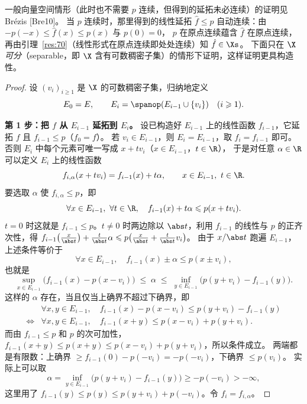 一般向量空间情形（此时也不需要 $p$ 连续，但得到的延拓未必连续）的证明见 Brézis [Bre10]。
当 $p$ 连续时，那里得到的线性延拓 $\hat f\leqslant p$ 自动连续：由 $-p(-x)\leqslant\hat f(x)\leqslant p(x)$ 与 $p(0)=0$，
$p$ 在原点连续蕴含 $\hat f$ 在原点连续，再由引理~\ref{res:70}（线性形式在原点连续即处处连续）知 $\hat f\in\Xs$。
下面只在 $\X$ \emph{可分}（separable，即 $\X$ 含有可数稠密子集）的情形下证明，这样证明更具构造性。

\begin{proof}
设 $(v_i)_{i\geqslant1}$ 是 $\X$ 的可数稠密子集，归纳地定义
\[
  E_0=E,\qquad E_i=\spanop(E_{i-1}\cup\{v_i\})\quad(i\geqslant1).
\]

\textbf{第 1 步：把 $f$ 从 $E_{i-1}$ 延拓到 $E_i$。}
设已构造好 $E_{i-1}$ 上的线性函数 $f_{i-1}$，它延拓 $f$ 且 $f_{i-1}\leqslant p$（$f_0=f$）。
若 $v_i\in E_{i-1}$，则 $E_i=E_{i-1}$，取 $f_i=f_{i-1}$ 即可。否则 $E_i$ 中每个元素可唯一写成 $x+tv_i$（$x\in E_{i-1}$，$t\in\R$），
于是对任意 $\alpha\in\R$ 可以定义 $E_i$ 上的线性函数
\[
  f_{i,\alpha}(x+tv_i)=f_{i-1}(x)+t\alpha,\qquad x\in E_{i-1},\ t\in\R .
\]
要选取 $\alpha$ 使 $f_{i,\alpha}\leqslant p$，即
\[
  \forall x\in E_{i-1},\ \forall t\in\R,\quad f_{i-1}(x)+t\alpha\leqslant p(x+tv_i).
\]
$t=0$ 时这就是 $f_{i-1}\leqslant p$。$t\neq0$ 时两边除以 $\abs t$，利用 $f_{i-1}$ 的线性与 $p$ 的正齐次性，得
$f_{i-1}\bigl(\tfrac{x}{\abs t}\bigr)+\tfrac{t}{\abs t}\alpha\leqslant p\bigl(\tfrac{x}{\abs t}+\tfrac{t}{\abs t}v_i\bigr)$。
由于 $x/\abs t$ 跑遍 $E_{i-1}$，上述条件等价于
\[
  \forall x\in E_{i-1},\quad f_{i-1}(x)\pm\alpha\leqslant p(x\pm v_i),
\]
也就是
\[
  \sup_{x\in E_{i-1}}\bigl(f_{i-1}(x)-p(x-v_i)\bigr)\;\leqslant\;\alpha\;\leqslant\;\inf_{y\in E_{i-1}}\bigl(p(y+v_i)-f_{i-1}(y)\bigr).
\]
这样的 $\alpha$ 存在，当且仅当上确界不超过下确界，即
\[
  \begin{aligned}
    &\forall x,y\in E_{i-1},\quad f_{i-1}(x)-p(x-v_i)\leqslant p(y+v_i)-f_{i-1}(y)\\
    \iff{}&\forall x,y\in E_{i-1},\quad f_{i-1}(x+y)\leqslant p(x-v_i)+p(y+v_i).
  \end{aligned}
\]
而由 $f_{i-1}\leqslant p$ 和 $p$ 的次可加性，$f_{i-1}(x+y)\leqslant p(x+y)\leqslant p(x-v_i)+p(y+v_i)$，所以条件成立。
两端都是有限数：上确界 $\geqslant f_{i-1}(0)-p(-v_i)=-p(-v_i)$，下确界 $\leqslant p(v_i)$。
实际上可以取
\[
  \alpha=\inf_{y\in E_{i-1}}\bigl(p(y+v_i)-f_{i-1}(y)\bigr)\geqslant-p(-v_i)>-\infty,
\]
这里用了 $f_{i-1}(y)\leqslant p(y)\leqslant p(y+v_i)+p(-v_i)$。令 $f_i=f_{i,\alpha}$。


\end{proof}
